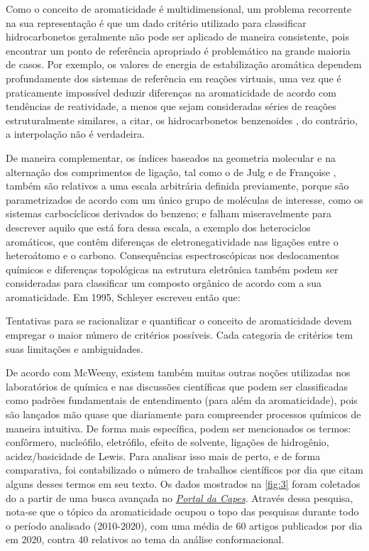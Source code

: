 
Como o conceito de aromaticidade é multidimensional, um problema recorrente na sua representação é que um dado critério utilizado para classificar hidrocarbonetos geralmente não pode ser aplicado de maneira consistente, pois encontrar um ponto de referência apropriado é problemático na grande maioria de casos. Por exemplo, os valores de energia de estabilização aromática dependem profundamente dos sistemas de referência em reações virtuais, uma vez que é praticamente impossível deduzir diferenças na aromaticidade de acordo com tendências de reatividade, a menos que sejam consideradas séries de reações estruturalmente similares, a citar, os hidrocarbonetos benzenoides \autocite{Ciesielski2009, Krygowski2014}, do contrário, a interpolação não é verdadeira. 

De maneira complementar, os índices baseados na geometria molecular e na alternação dos comprimentos de ligação, tal como o de Julg e de Françoise \autocite{Julg1967}, também são relativos a uma escala arbitrária definida previamente, porque são parametrizados de acordo com um único grupo de moléculas de interesse, como os sistemas carbocíclicos derivados do benzeno; e falham miseravelmente para descrever aquilo que está fora dessa escala, a exemplo dos heterociclos aromáticos, que contêm diferenças de eletronegatividade nas ligações entre o heteroátomo e o carbono. Consequências espectroscópicas nos deslocamentos químicos e diferenças topológicas na estrutura eletrônica também podem ser consideradas para classificar um composto orgânico de acordo com a sua aromaticidade. Em 1995, Schleyer \autocite{Schleyer1996} escreveu então que:

\begin{citacao}
Tentativas para se racionalizar e quantificar o conceito de aromaticidade devem empregar o maior número de critérios possíveis. Cada categoria de critérios tem suas limitações e ambiguidades\autocite{Schleyer1996}.
\end{citacao}

De acordo com McWeeny, existem também muitas outras noções utilizadas nos laboratórios de química e nas discussões científicas que podem ser classificadas como padrões fundamentais de entendimento (para além da aromaticidade), pois são lançados mão quase que diariamente para compreender processos químicos de maneira intuitiva. De forma mais específica, podem ser mencionados os termos: confôrmero, nucleófilo, eletrófilo, efeito de solvente, ligações de hidrogênio, acidez/basicidade de Lewis. Para analisar isso mais de perto, e de forma comparativa, foi contabilizado o número de trabalhos científicos por dia que citam alguns desses termos em seu texto. Os dados mostrados na \autoref{fig:3} foram coletados do a partir de uma busca avançada no \href{https://www-periodicos-capes-gov-br.ez46.periodicos.capes.gov.br/index.php?}{\textit{Portal da Capes}}. Através dessa pesquisa, nota-se que o tópico da aromaticidade ocupou o topo das pesquisas durante todo o período analisado (2010-2020), com uma média de 60 artigos publicados por dia em 2020, contra 40 relativos ao tema da análise conformacional.

